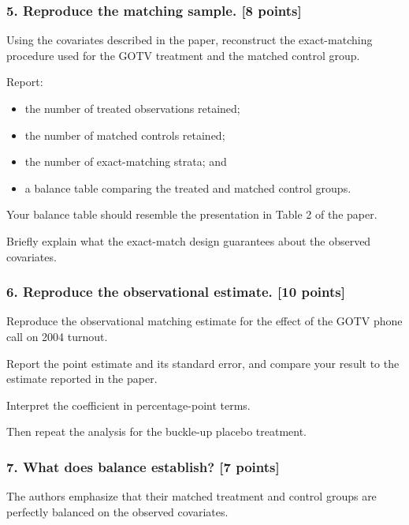 \documentclass[
]{article}
\providecommand{\tightlist}{%
  \setlength{\itemsep}{0pt}\setlength{\parskip}{0pt}}
\begin{document}
\subsubsection{5. Reproduce the matching sample. {[}8
points{]}}\label{reproduce-the-matching-sample.-8-points}

Using the covariates described in the paper, reconstruct the
exact-matching procedure used for the GOTV treatment and the matched
control group.

Report:

\begin{itemize}
\tightlist
\item
  the number of treated observations retained;
\item
  the number of matched controls retained;
\item
  the number of exact-matching strata; and
\item
  a balance table comparing the treated and matched control groups.
\end{itemize}

Your balance table should resemble the presentation in Table 2 of the
paper.

Briefly explain what the exact-match design guarantees about the
observed covariates.

\subsubsection{6. Reproduce the observational estimate. {[}10
points{]}}\label{reproduce-the-observational-estimate.-10-points}

Reproduce the observational matching estimate for the effect of the GOTV
phone call on 2004 turnout.

Report the point estimate and its standard error, and compare your
result to the estimate reported in the paper.

Interpret the coefficient in percentage-point terms.

Then repeat the analysis for the buckle-up placebo treatment.

\subsubsection{7. What does balance establish? {[}7
points{]}}\label{what-does-balance-establish-7-points}

The authors emphasize that their matched treatment and control groups
are perfectly balanced on the observed covariates.
\end{document}
